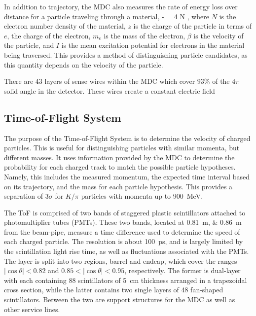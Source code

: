 In addition to trajectory, the MDC also measures the rate of energy loss over distance for a particle traveling through a material, 
\beq
- = 4 \pi N  ,
\eeq
where $N$ is the electron number density of the material, $z$ is the charge of the particle in terms of $e$, the charge of the electron, $m_e$ is the mass of the electron, $\beta$ is the velocity of the particle, and $I$ is the mean excitation potential for electrons in the material being traversed.
This provides a method of distinguishing particle candidates, as this quantity depends on the velocity of the particle.


There are 43 layers of sense wires within the MDC which cover $93\%$ of the $4\pi$ solid angle in the detector.
These wires create a constant electric field 


\subsection{Time-of-Flight System}
\label{ssec:detector_tof}

The purpose of the Time-of-Flight System is to determine the velocity of charged particles.
This is useful for distinguishing particles with similar momenta, but different masses.
It uses information provided by the MDC to determine the probability for each charged track to match the possible particle hypotheses.
Namely, this includes the measured momentum, the expected time interval based on its trajectory, and the mass for each particle hypothesis.
This provides a separation of $3\sigma$ for $K / \pi$ particles with momenta up to \SI{900}{\MeV}.


The ToF is comprised of two bands of staggered plastic scintillators attached to photomultiplier tubes (PMTs).
These two bands, located at \SIlist{0.81;0.86}{\m} from the beam-pipe, measure a time difference used to determine the speed of each charged particle.
The resolution is about \SI{100}{\ps}, and is largely limited by the scintillation light rise time, as well as fluctuations associated with the PMTs.
The layer is split into two regions, barrel and endcap, which cover the ranges $|\cos\theta| < 0.82$ and $0.85 < |\cos\theta| < 0.95$, respectively.
The former is dual-layer with each containing 88 scintillators of \SI{5}{\cm} thickness arranged in a trapezoidal cross section, while the latter contains two single layers of 48 fan-shaped scintillators.
Between the two are support structures for the MDC as well as other service lines.


